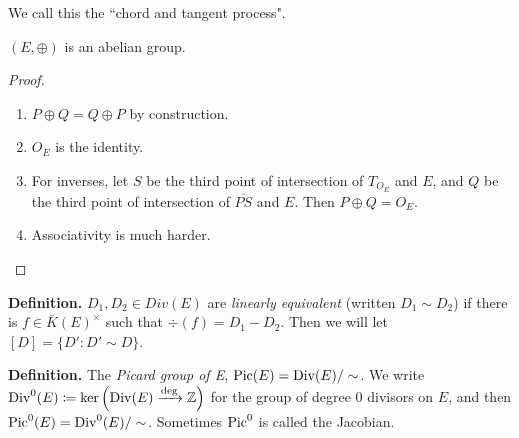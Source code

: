 \documentclass[10pt,a4paper]{article}
\begin{document}
We call this the ``chord and tangent process".

\begin{theorem}
  $(E, \oplus)$ is an abelian group.
\end{theorem}
\begin{proof}\hspace*{0cm}
  \begin{enumerate}[label=(\roman*)]
    \item $P\oplus Q = Q\oplus P$ by construction.
    \item $O_E$ is the identity.
    \item For inverses, let $S$ be the third point of intersection of $T_{O_E}$ and $E$, and $Q$ be the third point of intersection of $\overline{PS}$ and $E$. Then $P\oplus Q = O_E$.
    \item Associativity is much harder.
  \end{enumerate}
\end{proof}
\textbf{Definition.} $D_1, D_2 \in Div(E)$ are \emph{linearly equivalent} (written $D_1 \sim D_2$) if there is $f \in \bar{K}(E)^\times$ such that $\div(f)=D_1 - D_2$. Then we will let $[D] = \{D' : D'\sim D\}$.

\textbf{Definition.} The \emph{Picard group of E}, $\operatorname{Pic}(E) = \operatorname{Div}(E)/\sim$. We write $\operatorname{Div}^0(E) \coloneqq \ker\left(\operatorname{Div}(E) \xrightarrow{\deg} \mathbb{Z}\right)$ for the group of degree 0 divisors on $E$, and then $\operatorname{Pic}^0(E) = \operatorname{Div}^0(E)/\sim$. Sometimes $\operatorname{Pic}^0$ is called the Jacobian.
\end{document}
